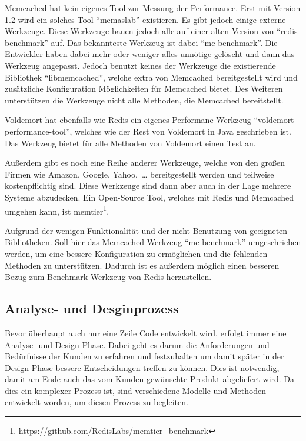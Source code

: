 Memcached hat kein eigenes Tool zur Messung der Performance. Erst mit Version
1.2 wird ein solches Tool \enquote{memaslab} existieren. Es gibt jedoch einige
externe Werkzeuge. Diese Werkzeuge bauen jedoch alle auf einer alten Version von
\enquote{redis-benchmark} auf. Das bekannteste Werkzeug ist dabei
\enquote{mc-benchmark}. Die Entwickler haben dabei mehr oder weniger alles
unnötige gelöscht und dann das Werkzeug angepasst. Jedoch benutzt keines der
Werkzeuge die existierende Bibliothek \enquote{libmemcached}, welche extra von
Memcached bereitgestellt wird und zusätzliche Konfiguration Möglichkeiten für
Memcached bietet. Des Weiteren unterstützen die Werkzeuge nicht alle Methoden,
die Memcached bereitstellt.

Voldemort hat ebenfalls wie Redis ein eigenes Performane-Werkzeug
\enquote{voldemort-performance-tool}, welches wie der Rest von Voldemort in Java
geschrieben ist. Das Werkzeug bietet für alle Methoden von Voldemort einen
Test an.

Außerdem gibt es noch eine Reihe anderer Werkzeuge, welche von den großen
Firmen wie Amazon, Google, Yahoo,~\dots{} bereitgestellt werden und teilweise
kostenpflichtig sind. Diese Werkzeuge sind dann aber auch in der Lage mehrere
Systeme abzudecken. Ein Open-Source Tool, welches mit Redis und Memcached
umgehen kann, ist
memtier\footnote{\url{https://github.com/RedisLabs/memtier_benchmark}}.

Aufgrund der wenigen Funktionalität und der nicht Benutzung von geeigneten
Bibliotheken. Soll hier das Memcached-Werkzeug \enquote{mc-benchmark}
umgeschrieben werden, um eine bessere Konfiguration zu ermöglichen und die
fehlenden Methoden zu unterstützen. Dadurch ist es außerdem möglich einen
besseren Bezug zum Benchmark-Werkzeug von Redis herzustellen.

\subsection{Analyse- und Desginprozess}
Bevor überhaupt auch nur eine Zeile Code entwickelt wird, erfolgt immer eine
Analyse- und Design-Phase. Dabei geht es darum die Anforderungen und Bedürfnisse
der Kunden zu erfahren und festzuhalten um damit später in der Design-Phase
bessere Entscheidungen treffen zu können. Dies ist notwendig, damit am Ende auch
das vom Kunden gewünschte Produkt abgeliefert wird. Da dies ein komplexer
Prozess ist, sind verschiedene Modelle und Methoden entwickelt worden, um diesen
Prozess zu begleiten.

